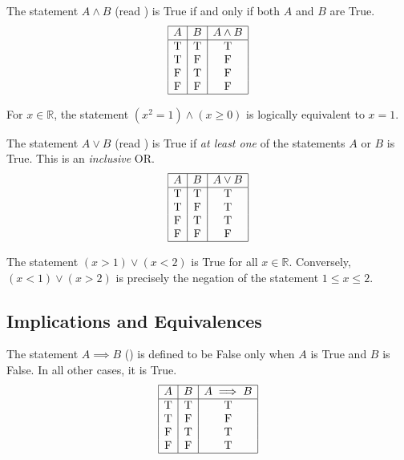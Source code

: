 \begin{definition}
The statement $A \wedge B$ (read ) is True if and only if both $A$ and $B$ are True.
\[
\begin{array}{|c|c|c|}
\hline
A & B & A \wedge B \\
\hline
\text{T} & \text{T} & \text{T} \\
\text{T} & \text{F} & \text{F} \\
\text{F} & \text{T} & \text{F} \\
\text{F} & \text{F} & \text{F} \\
\hline
\end{array}
\]
\end{definition}

\begin{example}
For $x \in \mathbb{R}$, the statement $(x^2 = 1) \wedge (x \ge 0)$ is logically equivalent to $x = 1$.
\end{example}

\begin{definition}[Disjunction / OR]
The statement $A \vee B$ (read ) is True if \textit{at least one} of the statements $A$ or $B$ is True. This is an \textit{inclusive} OR.
\[
\begin{array}{|c|c|c|}
\hline
A & B & A \vee B \\
\hline
\text{T} & \text{T} & \text{T} \\
\text{T} & \text{F} & \text{T} \\
\text{F} & \text{T} & \text{T} \\
\text{F} & \text{F} & \text{F} \\
\hline
\end{array}
\]
\end{definition}

\begin{example}
The statement $(x > 1) \vee (x < 2)$ is True for all $x \in \mathbb{R}$. Conversely, $(x < 1) \vee (x > 2)$ is precisely the negation of the statement $1 \le x \le 2$.
\end{example}

\subsection{Implications and Equivalences}

\begin{definition}[Implication]
The statement $A \implies B$ () is defined to be False only when $A$ is True and $B$ is False. In all other cases, it is True.
\[
\begin{array}{|c|c|c|}
\hline
A & B & A \implies B \\
\hline
\text{T} & \text{T} & \text{T} \\
\text{T} & \text{F} & \text{F} \\
\text{F} & \text{T} & \text{T} \\
\text{F} & \text{F} & \text{T} \\
\hline
\end{array}
\]
\end{definition}

